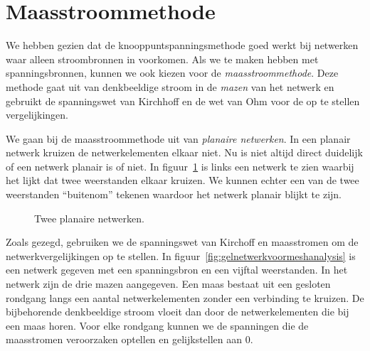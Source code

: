 \fi
\ifmaasstroom

\section{Maasstroommethode}
We hebben gezien dat de knooppuntspanningsmethode goed werkt bij netwerken waar alleen stroombronnen in voorkomen. Als we te maken hebben met spanningsbronnen, kunnen we ook kiezen voor de \textsl{maasstroommethode}. Deze methode gaat uit van denkbeeldige stroom in de \textsl{mazen} van het netwerk en gebruikt de spanningswet van Kirchhoff en de wet van Ohm voor de op te stellen vergelijkingen.

We gaan bij de maasstroommethode uit van \textsl{planaire netwerken}. In een planair netwerk kruizen de netwerkelementen elkaar niet. Nu is niet altijd direct duidelijk of een netwerk planair is of niet. In figuur~\ref{fig:gelplanairnetwerk} is links een netwerk te zien waarbij het lijkt dat twee weerstanden elkaar kruizen. We kunnen echter een van de twee weerstanden ``buitenom'' tekenen waardoor het netwerk planair blijkt te zijn.

\begin{figure}[!ht]
\centering
{}
\caption{Twee planaire netwerken.}
\label{fig:gelplanairnetwerk}
\end{figure}

Zoals gezegd, gebruiken we de spanningswet van Kirchoff en maasstromen om de netwerkvergelijkingen op te stellen. In figuur~\ref{fig:gelnetwerkvoormeshanalysis} is een netwerk gegeven met een spanningsbron en een vijftal weerstanden. In het netwerk zijn de drie mazen aangegeven. Een maas bestaat uit een gesloten rondgang langs een aantal netwerkelementen zonder een verbinding te kruizen. De bijbehorende denkbeeldige stroom vloeit dan door de netwerkelementen die bij een maas horen. Voor elke rondgang kunnen we de spanningen die de maasstromen veroorzaken optellen en gelijkstellen aan 0.

